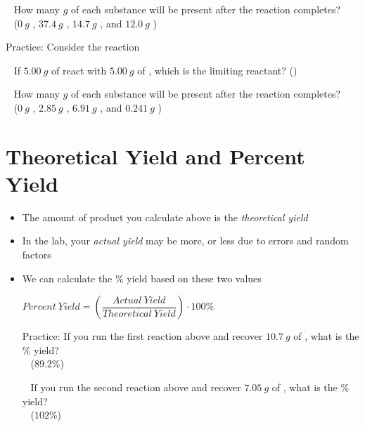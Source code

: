 \documentclass[12pt, openany, letterpaper]{memoir}
\begin{document}
\begin{itemize}
	~\hphantom{Practice:} How many $g$ of each substance will be present after the reaction completes?\\ 
	~\hphantom{Practice: } ($0~g$ , $37.4~g$ , $14.7~g$ , and $12.0~g$ )
	
	Practice: Consider the reaction 
	
	~\hphantom{Practice:} If $5.00~g$ of  react with $5.00~g$ of , which is the limiting reactant? \hspace{1em} ()
	
	~\hphantom{Practice:} How many $g$ of each substance will be present after the reaction completes?\\ 
	~\hphantom{Practice: } ($0~g$ , $2.85~g$ , $6.91~g$ , and $0.241~g$ )	
\end{itemize}
\section{Theoretical Yield and Percent Yield}
\begin{itemize}
	\item The amount of product you calculate above is the \emph{theoretical yield}
	\item In the lab, your \emph{actual yield} may be more, or less due to errors and random factors
	\item We can calculate the \% yield based on these two values
	
	$Percent~Yield = \left(\dfrac{Actual~Yield}{Theoretical~Yield}\right)\cdot 100\%$
	
	Practice: If you run the first reaction above and recover $10.7~g$ of , what is the \% yield?\\
	~\hphantom{Practice: } ($89.2\%$)
	
	~\hphantom{Practice:} If you run the second reaction above and recover $7.05~g$ of , what is the \% yield?\\
	~\hphantom{Practice: } ($102\%$)
\end{itemize}
\end{document}
